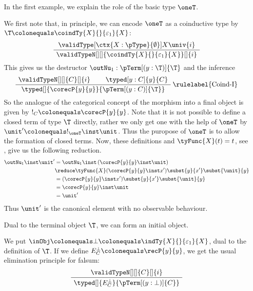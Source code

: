 \documentclass[preprint]{sigplanconf}
\begin{document}
In the first example, we explain the role of the basic type $\oneT$.
\begin{example}
  \label{ex:terminal-obj}
  We first note that, in principle, we can encode $\oneT$ as a coinductive
  type by $\T \colonequals \coindTy{X}{}{\varepsilon_1}{X}$:
\begin{gather*}
    \AxiomC{$\validType[\ctx{X : \pType}{\emptyset}]
      {X}{\univ{i}}$}
    \UnaryInfC{$\validTypeN[][]{
        \coindTy{X}{}{\varepsilon_1}{X}}[]{i}$}
    \DisplayProof
  \end{gather*}
This gives us the destructor $\outNu_1 : \pTerm[(y : \T)]{\T}$ and
  the inference
  \begin{gather*}
    \AxiomC{$\validTypeN[][]{C}[]{i}$}
    \AxiomC{$\typed[y : C]{y}{C}$}
    \RightLabel{\rulelabel{Coind-I}}
    \BinaryInfC{$\typed[]{\corecP{y}{y}}{\pTerm[(y : C)]{\T}}$}
\DisplayProof
  \end{gather*}
  So the analogue of the categorical concept of the morphism into a final
  object is given by $!_{C} \colonequals \corecP{y}{y}$.
  Note that it is not possible to define a closed term of type $\T$
  directly, rather we only get one with the help of $\oneT$ by
  $\unit' \colonequals !_{\oneT} \inst \unit$.
  Thus the puropose of $\oneT$ is to allow the formation of closed terms.
  Now, these definitions and $\tyFunc{X}(t) = t$, see ,
  give us the following reduction.
  \begin{align*}
    \outNu_1 \inst \unit'
    & = \outNu_1 \inst \, (\corecP{y}{y} \inst \unit) \\
    & \reduce \tyFunc{X}(\corecP{y}{y} \inst x')
    \subst{y}{x'} \subst{\unit}{y} \\
    & = (\corecP{y}{y} \inst x') \subst{y}{x'} \subst{\unit}{y} \\
    & = \corecP{y}{y} \inst \unit \\
    & = \unit'
  \end{align*}
  Thus $\unit'$ is the canonical element with no observable behaviour.
  \qedDef
\end{example}

Dual to the terminal object $\T$, we can form an initial object.
\begin{example}
  \label{ex:initial-object}
  We put $\inObj \colonequals \bot \colonequals \indTy{X}{}{\varepsilon_1}{X}$,
  dual to the definition of $\T$.
  If we define $E^\bot_C \colonequals \recP{y}{y}$,
  we get the usual elimination principle for falsum:
  \begin{gather*}
    \AxiomC{$\validTypeN[][]{C}[]{i}$}
    \UnaryInfC{$\typed[]{E^\bot_C}{\pTerm[(y : \bot)]{C}}$}
    \DisplayProof
  \end{gather*}
\end{example}
\end{document}
